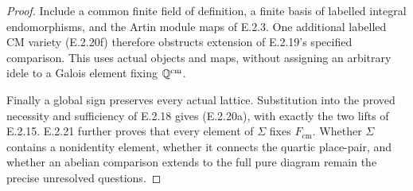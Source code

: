 \begin{proof}
Include a common finite field of definition, a finite
basis of labelled integral endomorphisms, and the
Artin module maps of E.2.3. One additional labelled
CM variety (E.2.20f) therefore obstructs extension
of E.2.19's specified comparison. This uses actual
objects and maps, without assigning an arbitrary
idele to a Galois element fixing \(\mathbb Q^{\mathrm{cm}}\).

Finally a global sign preserves every actual lattice.
Substitution into the proved necessity and sufficiency
of E.2.18 gives (E.2.20a), with exactly the two lifts
of E.2.15. E.2.21 further proves that every element
of \(\Sigma\) fixes \(F_{\mathrm{cm}}\).
Whether \(\Sigma\) contains a nonidentity
element, whether it connects the quartic place-pair,
and whether an abelian comparison extends to the full
pure diagram remain the precise unresolved questions.
\end{proof}

